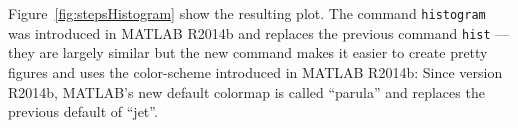 Figure~\ref{fig:stepsHistogram} show the resulting plot.
The  command \lstinline{histogram} was introduced in MATLAB R2014b and replaces the previous command \lstinline{hist} --- they are largely similar but the new command makes it easier to create pretty figures and uses the color-scheme introduced in MATLAB R2014b:
Since version R2014b, MATLAB's  new default colormap is called ``parula'' and replaces the previous default of ``jet''.